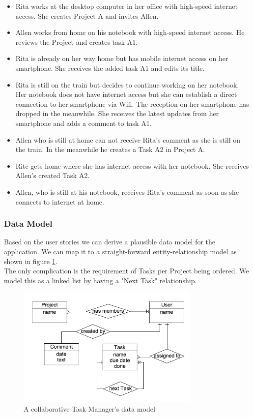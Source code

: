 \begin{itemize}
\item Rita works at the desktop computer in her office with high-speed internet access. She creates Project A and invites Allen.
\item Allen works from home on his notebook with high-speed internet access. He reviews the Project and creates task A1.
\item Rita is already on her way home but has mobile internet access on her smartphone. She receives the added task A1 and edits its title.
\item Rita is still on the train but decides to continue working on her notebook. Her notebook does not have internet access but she can establish a direct connection to her smartphone via Wifi. The reception on her smartphone has dropped in the meanwhile. She receives the latest updates from her smartphone and adds a comment to task A1.
\item Allen who is still at home can not receive Rita's comment as she is still on the train. In the meanwhile he creates a Task A2 in Project A.
\item Rite gets home where she has internet access with her notebook. She receives Allen's created Task A2.
\item Allen, who is still at his notebook, receives Rita's comment as soon as she connects to internet at home.
\end{itemize}

\subsubsection{Data Model}
Based on the user stories we can derive a plausible data model for the application. We can map it to a straight-forward entity-relationship model as shown in figure \ref{fig:tasks-data-model}.\\
The only complication is the requirement of Tasks per Project being ordered. We model this as a linked list by having a "Next Task" relationship.

\begin{figure}[tasks-data-model]
\centering
\includegraphics[width=0.8\textwidth]{img/tasks-schema}
\caption{A collaborative Task Manager's data model}
\label{fig:tasks-data-model}
\end{figure}

